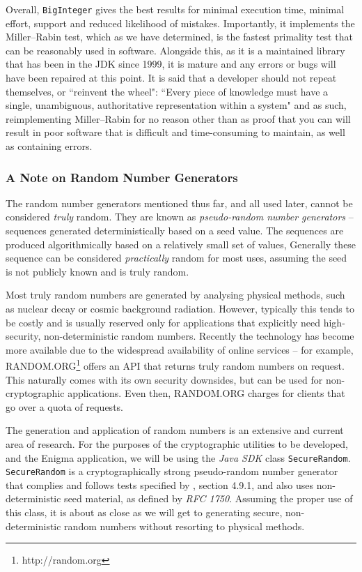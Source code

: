       Overall, \verb!BigInteger! gives the best results for minimal execution time, minimal effort, support and reduced likelihood of mistakes. Importantly, it implements the Miller--Rabin test, which as we have determined, is the fastest primality test that can be reasonably used in software. Alongside this, as it is a maintained library that has been in the JDK since 1999, it is mature and any errors or bugs will have been repaired at this point. It is said that a developer should not repeat themselves, or ``reinvent the wheel": ``Every piece of knowledge must have a single, unambiguous, authoritative representation within a system"\cite{Hunt:1999aa} and as such, reimplementing Miller--Rabin for no reason other than as proof that you can will result in poor software that is difficult and time-consuming to maintain, as well as containing errors.
    
    \subsubsection{A Note on Random Number Generators}
    
    The random number generators mentioned thus far, and all used later, cannot be considered \emph{truly} random. They are known as \emph{pseudo-random number generators} -- sequences generated deterministically based on a seed value. The sequences are produced algorithmically based on a relatively small set of values, Generally these sequence can be considered \emph{practically} random for most uses, assuming the seed is not publicly known and is truly random.
    
    Most truly random numbers are generated by analysing physical methods, such as nuclear decay or cosmic background radiation. However, typically this tends to be costly and is usually reserved only for applications that explicitly need high-security, non-deterministic random numbers. Recently the technology has become more available due to the widespread availability of online services -- for example, RANDOM.ORG\footnote{http://random.org} offers an API that returns truly random numbers on request. This naturally comes with its own security downsides, but can be used for non-cryptographic applications. Even then, RANDOM.ORG charges for clients that go over a quota of requests.
    
    The generation and application of random numbers is an extensive and current area of research. For the purposes of the cryptographic utilities to be developed, and the Enigma application, we will be using the \emph{Java SDK} class \verb!SecureRandom!. \verb!SecureRandom! is a cryptographically strong pseudo-random number generator that complies and follows tests specified by \cite{NIST:2001aa}, section 4.9.1, and also uses non-deterministic seed material, as defined by \emph{RFC 1750}\cite{Eastlake:1994aa}. Assuming the proper use of this class, it is about as close as we will get to generating secure, non-deterministic random numbers without resorting to physical methods.
    
